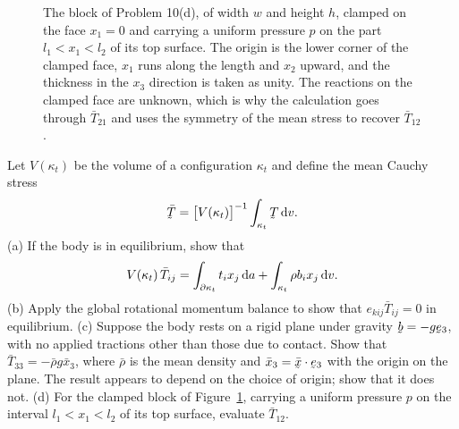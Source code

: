 \begin{figure}[htbp]\centering
{}
\caption{The block of Problem 10(d), of width $w$ and height $h$,
clamped on the face $x_{1}=0$ and carrying a uniform pressure $p$ on the
part $l_{1}<x_{1}<l_{2}$ of its top surface. The origin is the lower
corner of the clamped face, $x_{1}$ runs along the length and $x_{2}$
upward, and the thickness in the $x_{3}$ direction is taken as unity.
The reactions on the clamped face are unknown, which is why the
calculation goes through $\bar T_{21}$ and uses the symmetry of the mean
stress to recover $\bar T_{12}$.}
\label{fig:ch6block}
\end{figure}

\begin{problem}
Let $V(\kappa_{t})$ be the volume of a configuration $\kappa_{t}$ and
define the mean Cauchy stress
\[
   \bar\bT=\big[V(\kappa_{t})\big]^{-1}\int_{\kappa_{t}}\bT\,\dl v .
\]
\textup{(a)} If the body is in equilibrium, show that
\[
   V(\kappa_{t})\,\bar T_{ij}=\int_{\partial\kappa_{t}}t_{i}x_{j}\,\mathrm{d} a
   +\int_{\kappa_{t}}\rho b_{i}x_{j}\,\mathrm{d} v .
\]
\textup{(b)} Apply the global rotational momentum balance to show that
$e_{kij}\bar T_{ij}=0$ in equilibrium.
\textup{(c)} Suppose the body rests on a rigid plane under gravity
$\bb=-g\be_{3}$, with no applied tractions other than those due to
contact. Show that $\bar T_{33}=-\bar\rho g\bar x_{3}$, where $\bar\rho$
is the mean density and $\bar x_{3}=\ip{\bar\bx}{\be_{3}}$ with the
origin on the plane. The result appears to depend on the choice of
origin; show that it does not.
\textup{(d)} For the clamped block of Figure~\ref{fig:ch6block},
carrying a uniform pressure $p$ on the interval $l_{1}<x_{1}<l_{2}$ of
its top surface, evaluate $\bar T_{12}$.
\end{problem}

